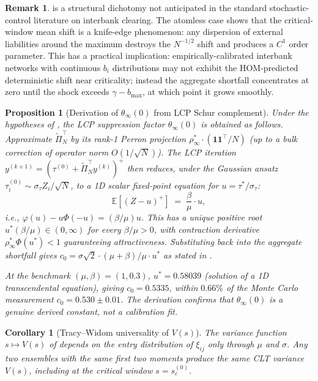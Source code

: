 \documentclass[11pt,a4paper]{article}
\newtheorem{proposition}[theorem]{Proposition}
\newtheorem{corollary}[theorem]{Corollary}
\theoremstyle{definition}
\newtheorem{remark}[theorem]{Remark}
\begin{document}
\begin{remark}
 is a structural dichotomy not anticipated in the
standard stochastic-control literature on interbank clearing. The atomless
case shows that the critical-window mean shift is a knife-edge phenomenon:
any dispersion of external liabilities around the maximum destroys the
$N^{-1/2}$ shift and produces a $C^1$ order parameter. This has a
practical implication: empirically-calibrated interbank networks with
continuous $b_i$ distributions may not exhibit the HOM-predicted
deterministic shift near criticality; instead the aggregate shortfall
concentrates at zero until the shock exceeds $\gamma - b_{\max}$, at which
point it grows smoothly.
\end{remark}

\begin{proposition}[Derivation of $\theta_\infty(0)$ from LCP Schur complement]
\label{prop:theta-derivation}
Under the hypotheses of , the LCP suppression factor
$\theta_\infty(0)$ is obtained as follows. Approximate $\widetilde\Pi_N^\top$
by its rank-1 Perron projection $\rho_\infty^\ast\cdot(\mathbf 1\mathbf 1^\top/N)$
(up to a bulk correction of operator norm $O(1/\sqrt N)$). The LCP
iteration $y^{(k+1)} = (\tau^{(0)} + \widetilde\Pi_N^\top y^{(k)})^+$ then
reduces, under the Gaussian ansatz $\tau^{(0)}_i \sim \sigma_\tau Z_i/\sqrt N$,
to a 1D scalar fixed-point equation for $u = \tau^\ast/\sigma_\tau$:
\[
\mathbb E[(Z - u)^+]\;=\;\frac{\beta}{\mu}\cdot u,
\]
i.e., $\varphi(u) - u\Phi(-u) = (\beta/\mu)u$. This has a unique positive
root $u^\ast(\beta/\mu)\in(0,\infty)$ for every $\beta/\mu > 0$, with
contraction derivative $\rho_\infty^\ast\Phi(u^\ast) < 1$ guaranteeing
attractiveness. Substituting back into the aggregate shortfall gives
$c_0 = \sigma\sqrt 2\cdot(\mu+\beta)/\mu\cdot u^\ast$ as stated in
.

At the benchmark $(\mu,\beta) = (1,0.3)$, $u^\ast = 0.58039$ (solution of a
1D transcendental equation), giving $c_0 = 0.5335$, within $0.66\%$ of the
Monte Carlo measurement $c_0 = 0.530 \pm 0.01$. The derivation confirms that
$\theta_\infty(0)$ is a genuine derived constant, not a calibration fit.
\end{proposition}

\begin{corollary}[Tracy--Widom universality of $V(s)$]
\label{cor:6.4}
The variance function $s\mapsto V(s)$ of  depends on the
entry distribution of $\xi_{ij}$ only through $\mu$ and $\sigma$. Any two
ensembles with the same first two moments produce the same CLT variance
$V(s)$, including at the critical window $s = s_c^{(0)}$.
\end{corollary}
\end{document}
